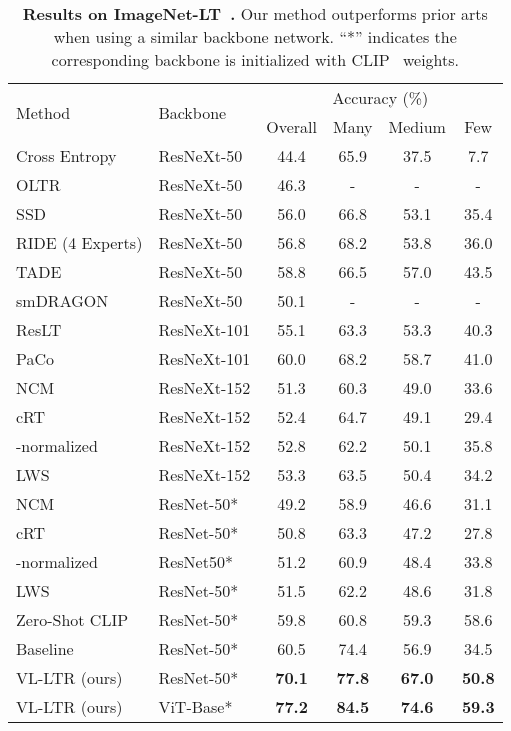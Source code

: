 \documentclass[runningheads]{llncs}
\newlength\savedwidth
\newcommand\whline{\noalign{\global\savedwidth\arrayrulewidth\global\arrayrulewidth 0.8pt}\hline\noalign{\global\arrayrulewidth\savedwidth}}
\begin{document}
\begin{table}[t]
    \centering
\setlength{\tabcolsep}{3mm}
    \begin{tabular}{l|l|c|c|c|c}
\multirow{2}{*}{Method} & \multirow{2}{*}{Backbone}  & \multicolumn{4}{c}{Accuracy (\%)} \\
	\cline{3-6} 
	&  & Overall & Many & Medium & Few  \\
	\whline
	Cross Entropy \cite{li2021self} & ResNeXt-50 & 44.4 & 65.9 & 37.5 & 7.7 \\
	OLTR \cite{liu2019large} & ResNeXt-50 & 46.3 & - & - & - \\
	SSD \cite{li2021self} & ResNeXt-50 & 56.0 & 66.8 & 53.1 & 35.4 \\
	RIDE (4 Experts) \cite{wang2020long} & ResNeXt-50 & 56.8 & 68.2 & 53.8 & 36.0 \\
	TADE~\cite{zhang2021test} & ResNeXt-50 & 58.8 & 66.5 & 57.0 & 43.5 \\
	smDRAGON~\cite{samuel2021generalized} & ResNeXt-50 & 50.1 & - & - & - \\
	ResLT~\cite{cui2021reslt} & ResNeXt-101 & 55.1 & 63.3 & 53.3 & 40.3 \\
	PaCo~\cite{cui2021parametric} & ResNeXt-101 & 60.0 & 68.2 & 58.7 & 41.0 \\
	NCM \cite{kang2019decoupling} & ResNeXt-152 & 51.3 & 60.3 & 49.0 & 33.6 \\
	cRT \cite{kang2019decoupling} & ResNeXt-152 & 52.4 & 64.7 & 49.1 & 29.4 \\
	-normalized \cite{kang2019decoupling} & ResNeXt-152 & 52.8 & 62.2 & 50.1 & 35.8 \\
	LWS \cite{kang2019decoupling} & ResNeXt-152 & 53.3 & 63.5 & 50.4 & 34.2 \\
	\hline
	NCM \cite{kang2019decoupling} & ResNet-50* & 49.2 & 58.9 & 46.6 & 31.1 \\
	cRT \cite{kang2019decoupling} & ResNet-50* & 50.8 & 63.3 & 47.2 & 27.8 \\
	-normalized \cite{kang2019decoupling} & ResNet50* & 51.2 & 60.9 & 48.4 & 33.8 \\
	LWS \cite{kang2019decoupling} & ResNet-50* & 51.5 & 62.2 & 48.6 & 31.8 \\
	Zero-Shot CLIP \cite{clip} & ResNet-50* & 59.8   &  60.8  &  59.3  &  58.6 \\
	Baseline & ResNet-50* & 60.5 & 74.4 & 56.9 & 34.5 \\
	\rowcolor{mygray}
	VL-LTR (ours) & ResNet-50* & \bf{70.1} & \bf{77.8} & \bf{67.0} & \bf{50.8} \\
	\rowcolor{mygray}
	VL-LTR (ours) & ViT-Base* & \bf{77.2} & \bf{84.5} & \bf{74.6} & \bf{59.3} \\
	
\end{tabular} \caption{\textbf{Results on ImageNet-LT~\cite{liu2019large}.}
Our method outperforms prior arts when using a similar backbone network.
    ``*'' indicates the corresponding backbone is initialized with CLIP~\cite{clip} weights.}
    \label{tab:imnet_lt}
\end{table}
\end{document}

